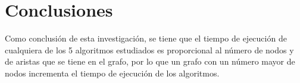 \documentclass{article}
\begin{document}
\section{Conclusiones}
Como conclusión de esta investigación, se tiene que el tiempo de ejecución de cualquiera de los 5 algoritmos estudiados es proporcional al número de nodos y de aristas que se tiene en el grafo, por lo que un grafo con un número mayor de nodos incrementa el tiempo de ejecución de los algoritmos.


\end{document}
